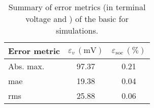 
\begin{table}[!htb]
    \caption[Error-metrics summary of basic  for  current profile]{Summary of error
        metrics (in terminal voltage and ) of the basic  for  
    simulations.}
    \label{tbl:errorsummaryuddsdischgspmp2d}
    \centering
    \begin{tabular}{@{} l S S @{}} \toprule
        {Error metric} & {$\varepsilon_v\, (\si{\milli\volt})$} & {$\varepsilon_\text{soc}\, (\si{\percent})$} \\ \midrule
        {Abs. max.}    & 97.37                                  & 0.21                                         \\
        {\gls{mae}}    & 19.38                                  & 0.04                                         \\
        {\gls{rms}}    & 25.88                                  & 0.06                                         \\ \bottomrule
    \end{tabular}
\end{table}
